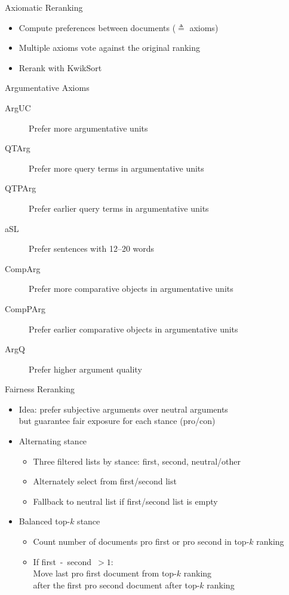 \documentclass[english]{mlutalk}
\begin{document}
\begin{frame}{Axiomatic Reranking}
  \begin{itemize}
    \item Compute preferences between documents (\(\triangleq\) axioms)
    \item Multiple axioms vote against the original ranking
    \item Rerank with KwikSort~\cite{hagen:2016d}
  \end{itemize}
  \begin{block}{Argumentative Axioms}
    \begin{description}
      \item[ArgUC] Prefer more argumentative units~\cite{bondarenko:2018}
      \item[QTArg] Prefer more query terms in argumentative units~\cite{bondarenko:2018}
      \item[QTPArg] Prefer earlier query terms in argumentative units~\cite{bondarenko:2018}
      \item[aSL] Prefer sentences with 12--20 words~\cite{bondarenkoaxiomatic}
      \item[CompArg] Prefer more comparative objects in argumentative units
      \item[CompPArg] Prefer earlier comparative objects in argumentative units
      \item[ArgQ] Prefer higher argument quality
    \end{description}
  \end{block}
\end{frame}

\begin{frame}{Fairness Reranking}
  \begin{itemize}
    \item Idea: prefer subjective arguments over neutral arguments \\
    but guarantee fair exposure for each stance (pro/con)
    \item Alternating stance
    \begin{itemize}
      \item Three filtered lists by stance: first, second, neutral/other
      \item Alternately select from first/second list
      \item Fallback to neutral list if first/second list is empty
    \end{itemize}
    \item Balanced top-\(k\) stance
    \begin{itemize}
      \item Count number of documents pro first or pro second in top-\(k\) ranking
      \item If first~-~second~\(>1\): \\
      Move last pro first document from top-\(k\) ranking \\
      after the first pro second document after top-\(k\) ranking
    \end{itemize}
  \end{itemize}
\end{frame}
\end{document}
